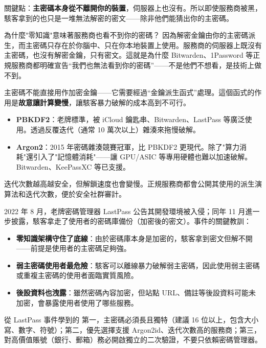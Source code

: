 關鍵點：\textbf{主密碼本身從不離開你的裝置}，伺服器上也沒有。所以即使服務商被黑，駭客拿到的也只是一堆無法解密的密文——除非他們能猜出你的主密碼。

\begin{tcbinfo}{為什麼"零知識"意味著服務商也看不到你的密碼？}
因為解密金鑰由你的主密碼派生，而主密碼只存在於你腦中、只在你本地裝置上使用。服務商的伺服器上既沒有主密碼，也沒有解密金鑰，只有密文。這就是為什麼 Bitwarden、1Password 等正規服務商都明確宣告“我們也無法看到你的密碼”——不是他們不想看，是技術上做不到。

\end{tcbinfo}


主密碼不能直接用作加密金鑰——它需要經過“金鑰派生函式”處理。這個函式的作用是\textbf{故意讓計算變慢}，讓駭客暴力破解的成本高到不可行。

\begin{itemize}
  \item \textbf{PBKDF2}：老牌標準，被 iCloud 鑰匙串、Bitwarden、LastPass 等廣泛使用。透過反覆迭代（通常 10 萬次以上）雜湊來拖慢破解。
  \item \textbf{Argon2}：2015 年密碼雜湊競賽冠軍，比 PBKDF2 更現代。除了"算力消耗"還引入了"記憶體消耗"——讓 GPU/ASIC 等專用硬體也難以加速破解。Bitwarden、KeePassXC 等已支援。
\end{itemize}

迭代次數越高越安全，但解鎖速度也會變慢。正規服務商都會公開其使用的派生演算法和迭代次數，便於安全社群審計。


2022 年 8 月，老牌密碼管理器 LastPass 公告其開發環境被入侵；同年 11 月進一步披露，駭客拿走了使用者的密碼庫備份（加密後的密文）。事件的關鍵教訓：

\begin{itemize}
  \item \textbf{零知識架構守住了底線}：由於密碼庫本身是加密的，駭客拿到密文但解不開——前提是使用者的主密碼足夠強。
  \item \textbf{弱主密碼使用者最危險}：駭客可以離線暴力破解弱主密碼，因此使用弱主密碼或重複主密碼的使用者面臨實質風險。
  \item \textbf{後設資料也洩露}：雖然密碼內容加密，但站點 URL、備註等後設資料可能未加密，會暴露使用者使用了哪些服務。
\end{itemize}

\begin{tcbwarn}{從 LastPass 事件學到的}
第一，主密碼必須長且獨特（建議 16 位以上，包含大小寫、數字、符號）；第二，優先選擇支援 Argon2id、迭代次數高的服務商；第三，對高價值賬號（銀行、郵箱）務必開啟獨立的二次驗證，不要只依賴密碼管理器。

\end{tcbwarn}


